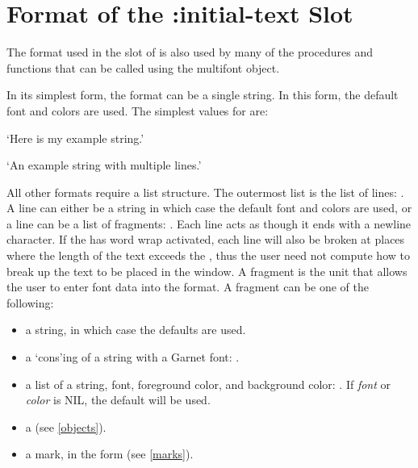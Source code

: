 \section{Format of the :initial-text Slot}

The format used in the  slot of 
is also used by many of the procedures and
functions that can be called using the multifont object.

In its simplest form, the  format can be a single
string.  In this form, the default font and colors are used.
The simplest values for  are:

\begin{programexample}
`Here is my example string.'

`An example string
with multiple lines.'
\end{programexample}

All other formats require a list structure.  The outermost list is the list of
lines:  .  A line can either be a string in which
case the default font and colors are used, or
a line can be a list of fragments:
.  Each line acts as though it ends with a newline
character.  If the  has word wrap activated, each line will
also be broken at places where the length of the text exceeds the
, thus the user need not compute how to break up the text to
be placed in the window.  A fragment is the unit that allows the user to enter
font data into the  format.  A fragment can be
one of the following:
\begin{itemize}
\item a string,  in which case the defaults are used.

\item a `cons'ing of a string with a Garnet font:  .

\item a list of a string, font, foreground color, and background color:
.  If {\it font} or
{\it color} is NIL, the default will be used.

\item a  (see \ref{objects}).

\item a mark, in the form  (see \ref{marks}).
\end{itemize}

